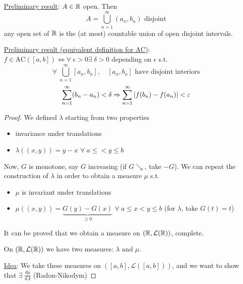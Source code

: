 \noindent\underline{Preliminary result}: \(A \in \mathbb{R}\) open. Then 
\[
    A = \bigcup_{n=1}^{\infty}(a_n, b_n) \mbox{ disjoint}
\]
    any open set of \(\mathbb{R}\) is the (at most) countable union of open disjoint intervals.

\noindent\underline{Preliminary result (equivalent definition for AC)}: \(f \in \mbox{AC}([a,b]) \Leftrightarrow \forall \; \epsilon > 0 \exists \; \delta > 0\) depending on \(\epsilon\) s.t. 
\[
    \forall \; \bigcup_{n=1}^{\infty} [a_n, b_n], \quad [a_n, b_n] \mbox{ have disjoint interiors}
\]
\[
    \sum_{n=1}^{\infty} (b_n -a_n) < \delta \Rightarrow \sum_{n=1}^{\infty} \abs{f(b_n) - f(a_n)} < \varepsilon
\]
\begin{proof}
    We defined \(\lambda\) starting from two properties
    \begin{itemize}
        \item invariance under translations
        \item \(\lambda((x,y)) = y - x\) \(\forall \; a \leq < y \leq b\)
    \end{itemize}
    Now, \(G\) is monotone, say \(G\) increasing (if \(G \searrow\), take \(-G\)). We can repeat the construction of \(\lambda\) in order to obtain a measure \(\mu\) s.t. 
    \begin{itemize}
        \item \(\mu\) is invariant under translations
        \item \(\mu((x,y)) = \underbrace{G(y) - G(x)}_{\geq 0}\) \(\forall \; a \leq x < y \leq b\) (for \(\lambda\), take \(G(t) = t\))
    \end{itemize}
It can be proved that we obtain a measure on \((\mathbb{R}, \mathcal{L}(\mathbb{R}))\), complete.

On \((\mathbb{R}, \mathcal{L}(\mathbb{R}))\) we have two measures: \(\lambda \mbox{ and } \mu\).

\noindent\underline{Idea}: We take these measures on \(([a,b], \mathcal{L}([a,b]))\), and we want to show that \(\exists \; \frac{d\mu}{d\Lambda}\) (Radon-Nikodym)


\end{proof}
